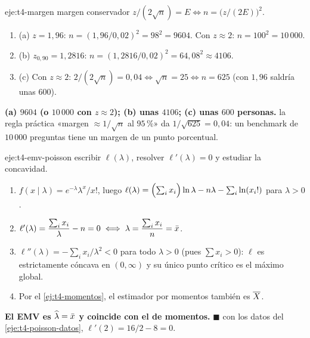 \begin{solucion}{eje:t4-margen}
\planteamiento margen conservador $z/(2\sqrt n)=E\iff n=\bigl(z/(2E)\bigr)^{2}$.
\pasos
\begin{enumerate}[label=\arabic*.]
  \item (a) $z=1{,}96$: $n=(1{,}96/0{,}02)^{2}=98^{2}=9604$. Con $z\approx2$: $n=100^{2}=10\,000$.
  \item (b) $z_{0{,}90}=1{,}2816$: $n=(1{,}2816/0{,}02)^{2}=64{,}08^{2}\approx4106$.
  \item (c) Con $z\approx2$: $2/(2\sqrt n)=0{,}04\iff\sqrt n=25\iff n=625$ (con $1{,}96$ saldría unas $600$).
\end{enumerate}
\resultado \textbf{(a) $9604$ (o $10\,000$ con $z\approx2$); (b) unas $4106$; (c) unas $600$ personas.}
\comprobacion la regla práctica «margen $\approx1/\sqrt n$ al $95\,\%$» da $1/\sqrt{625}=0{,}04$: un benchmark de $10\,000$ preguntas tiene un margen de un punto porcentual.
\end{solucion}

\begin{solucion}{eje:t4-emv-poisson}
\planteamiento escribir $\ell(\lambda)$, resolver $\ell'(\lambda)=0$ y estudiar la concavidad.
\pasos
\begin{enumerate}[label=\arabic*.]
  \item $f(x\mid\lambda)=e^{-\lambda}\lambda^{x}/x!$, luego $\ell(\lambda)=\Bigl(\sum_ix_i\Bigr)\ln\lambda-n\lambda-\sum_i\ln(x_i!)$ para $\lambda>0$.
  \item $\ell'(\lambda)=\dfrac{\sum_ix_i}{\lambda}-n=0\iff\lambda=\dfrac{\sum_ix_i}{n}=\bar{x}$.
  \item $\ell''(\lambda)=-\sum_ix_i/\lambda^{2}<0$ para todo $\lambda>0$ (pues $\sum x_i>0$): $\ell$ es estrictamente cóncava en $(0,\infty)$ y su único punto crítico es el máximo global.
  \item Por el \cref{ej:t4-momentos}, el estimador por momentos también es $\overline{X}$.
\end{enumerate}
\resultado \textbf{El EMV es $\widehat\lambda=\bar{x}$ y coincide con el de momentos.} $\blacksquare$
\comprobacion con los datos del \cref{eje:t4-poisson-datos}, $\ell'(2)=16/2-8=0$.
\end{solucion}

